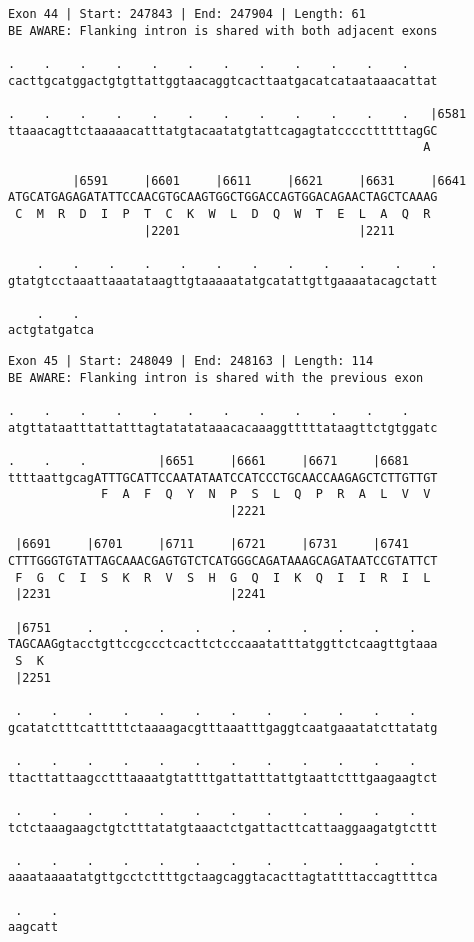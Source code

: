 \documentclass{article}
\begin{document}
\newpage
\begin{Verbatim}[fontfamily=courier]
Exon 44 | Start: 247843 | End: 247904 | Length: 61
BE AWARE: Flanking intron is shared with both adjacent exons

.    .    .    .    .    .    .    .    .    .    .    .    
cacttgcatggactgtgttattggtaacaggtcacttaatgacatcataataaacattat

.    .    .    .    .    .    .    .    .    .    .    .   |6581
ttaaacagttctaaaaacatttatgtacaatatgtattcagagtatccccttttttagGC
                                                          A 

         |6591     |6601     |6611     |6621     |6631     |6641
ATGCATGAGAGATATTCCAACGTGCAAGTGGCTGGACCAGTGGACAGAACTAGCTCAAAG
 C  M  R  D  I  P  T  C  K  W  L  D  Q  W  T  E  L  A  Q  R 
                   |2201                         |2211      

    .    .    .    .    .    .    .    .    .    .    .    .
gtatgtcctaaattaaatataagttgtaaaaatatgcatattgttgaaaatacagctatt

    .    .  
actgtatgatca
\end{Verbatim}
\newpage
\begin{Verbatim}[fontfamily=courier]
Exon 45 | Start: 248049 | End: 248163 | Length: 114
BE AWARE: Flanking intron is shared with the previous exon

.    .    .    .    .    .    .    .    .    .    .    .    
atgttataatttattatttagtatatataaacacaaaggtttttataagttctgtggatc

.    .    .          |6651     |6661     |6671     |6681    
ttttaattgcagATTTGCATTCCAATATAATCCATCCCTGCAACCAAGAGCTCTTGTTGT
             F  A  F  Q  Y  N  P  S  L  Q  P  R  A  L  V  V 
                               |2221                        

 |6691     |6701     |6711     |6721     |6731     |6741    
CTTTGGGTGTATTAGCAAACGAGTGTCTCATGGGCAGATAAAGCAGATAATCCGTATTCT
 F  G  C  I  S  K  R  V  S  H  G  Q  I  K  Q  I  I  R  I  L 
 |2231                         |2241                        

 |6751     .    .    .    .    .    .    .    .    .    .   
TAGCAAGgtacctgttccgccctcacttctcccaaatatttatggttctcaagttgtaaa
 S  K                                                       
 |2251                                                      

 .    .    .    .    .    .    .    .    .    .    .    .   
gcatatctttcatttttctaaaagacgtttaaatttgaggtcaatgaaatatcttatatg

 .    .    .    .    .    .    .    .    .    .    .    .   
ttacttattaagcctttaaaatgtattttgattatttattgtaattctttgaagaagtct

 .    .    .    .    .    .    .    .    .    .    .    .   
tctctaaagaagctgtctttatatgtaaactctgattacttcattaaggaagatgtcttt

 .    .    .    .    .    .    .    .    .    .    .    .   
aaaataaaatatgttgcctcttttgctaagcaggtacacttagtattttaccagttttca

 .    .
aagcatt
\end{Verbatim}
\end{document}
